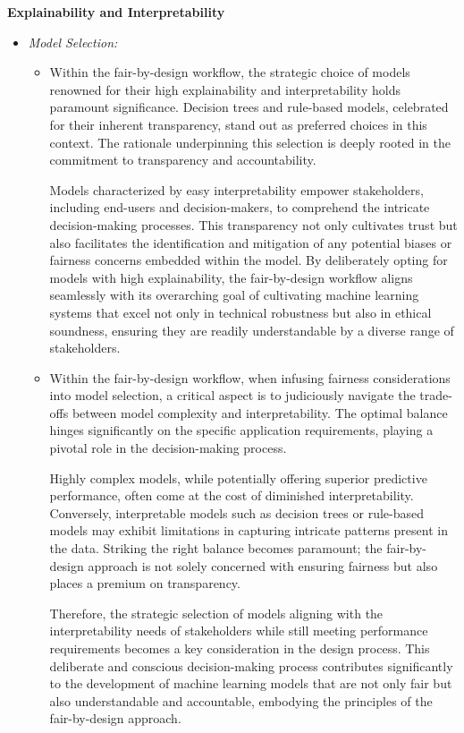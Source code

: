 \textbf{Explainability and Interpretability}

\begin{itemize}

    \item \emph{Model Selection:}

    \begin{itemize}

        \item Within the fair-by-design workflow, the strategic choice of models renowned for their high explainability and interpretability holds paramount significance. Decision trees and rule-based models, celebrated for their inherent transparency, stand out as preferred choices in this context. The rationale underpinning this selection is deeply rooted in the commitment to transparency and accountability.

        Models characterized by easy interpretability empower stakeholders, including end-users and decision-makers, to comprehend the intricate decision-making processes. This transparency not only cultivates trust but also facilitates the identification and mitigation of any potential biases or fairness concerns embedded within the model. By deliberately opting for models with high explainability, the fair-by-design workflow aligns seamlessly with its overarching goal of cultivating machine learning systems that excel not only in technical robustness but also in ethical soundness, ensuring they are readily understandable by a diverse range of stakeholders.

        \item Within the fair-by-design workflow, when infusing fairness considerations into model selection, a critical aspect is to judiciously navigate the trade-offs between model complexity and interpretability. The optimal balance hinges significantly on the specific application requirements, playing a pivotal role in the decision-making process.

        Highly complex models, while potentially offering superior predictive performance, often come at the cost of diminished interpretability. Conversely, interpretable models such as decision trees or rule-based models may exhibit limitations in capturing intricate patterns present in the data. Striking the right balance becomes paramount; the fair-by-design approach is not solely concerned with ensuring fairness but also places a premium on transparency.
        
        Therefore, the strategic selection of models aligning with the interpretability needs of stakeholders while still meeting performance requirements becomes a key consideration in the design process. This deliberate and conscious decision-making process contributes significantly to the development of machine learning models that are not only fair but also understandable and accountable, embodying the principles of the fair-by-design approach.

    \end{itemize}

\end{itemize}

